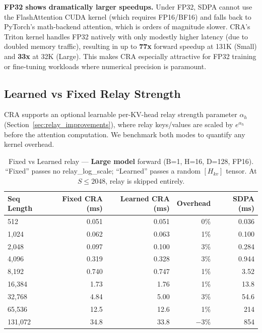 \documentclass{article}
\begin{document}
    \textbf{FP32 shows dramatically larger speedups.} Under FP32, SDPA cannot use the FlashAttention CUDA kernel (which requires FP16/BF16) and falls back to PyTorch's math-backend attention, which is orders of magnitude slower. CRA's Triton kernel handles FP32 natively with only modestly higher latency (due to doubled memory traffic), resulting in up to \textbf{77x} forward speedup at 131K (Small) and \textbf{33x} at 32K (Large). This makes CRA especially attractive for FP32 training or fine-tuning workloads where numerical precision is paramount.

    \subsection{Learned vs Fixed Relay Strength}
    \label{sec:learned_relay}

    CRA supports an optional learnable per-KV-head relay strength parameter $\alpha_h$ (Section~\ref{sec:relay_improvements}), where relay keys/values are scaled by $e^{\alpha_h}$ before the attention computation. We benchmark both modes to quantify any kernel overhead.

    \begin{table}[h]
    \centering
    \caption{Fixed vs Learned relay --- \textbf{Large model} forward (B=1, H=16, D=128, FP16). ``Fixed'' passes no relay\_log\_scale; ``Learned'' passes a random $[H_{kv}]$ tensor. At $S \leq 2048$, relay is skipped entirely.}
    \begin{tabular}{lrrrr}
    \toprule
    Seq Length & Fixed CRA (ms) & Learned CRA (ms) & Overhead & SDPA (ms) \\
    \midrule
    512 & 0.051 & 0.051 & 0\% & 0.036 \\
    1,024 & 0.062 & 0.063 & 1\% & 0.100 \\
    2,048 & 0.097 & 0.100 & 3\% & 0.284 \\
    4,096 & 0.319 & 0.328 & 3\% & 0.944 \\
    8,192 & 0.740 & 0.747 & 1\% & 3.52 \\
    16,384 & 1.73 & 1.76 & 1\% & 13.8 \\
    32,768 & 4.84 & 5.00 & 3\% & 54.6 \\
    65,536 & 12.5 & 12.6 & 1\% & 214 \\
    131,072 & 34.8 & 33.8 & $-$3\% & 854 \\
    \bottomrule
    \end{tabular}
    \label{tab:learned_relay}
    \end{table}
\end{document}
